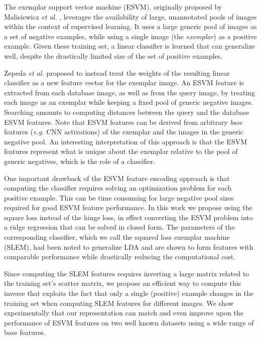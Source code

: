 The exemplar support vector machine (ESVM), originally proposed by Malisiewicz {\it et al.} \cite{Malisiewicza}, leverages the availability of large, unannotated pools of images within the context of supervised learning. It uses a large generic pool of images as a set of negative examples, while using a single image (the \emph{exemplar}) as a positive example. Given these training set, a linear classifier is learned that can  generalize well, despite the drastically limited size of the set of positive examples.

Zepeda \emph{et al.} \cite{ZePe15} proposed to instead treat the weights of the resulting linear classifier as a new feature vector for the exemplar image. %
An ESVM feature is extracted from each database image, as well as from the query image, by treating each image as an exemplar while keeping a fixed pool of generic negative images. Searching amounts to computing distances between the query and the database ESVM features. Note that ESVM features can be derived from arbitrary \emph{base} features ({\it e.g.} CNN activations) of the exemplar and the images in the generic negative pool. An interesting interpretation of this approach is that the ESVM features represent what is unique about the exemplar relative to the pool of generic negatives, which is the role of a classifier.


One important drawback of the ESVM feature encoding approach is that computing the  classifier requires solving an optimization problem for each positive example. This can be time consuming for large negative pool sizes required for good ESVM feature performance. In this work we propose using the square loss instead of the hinge loss, in effect converting the ESVM problem into a ridge regression that can be solved in closed form. The parameters of the corresponding classifier, which we call the squared loss exemplar machine (SLEM), had been noted to generalize LDA \cite{Koba15} and are shown to form features with comparable performance while drastically reducing the computational cost.


Since computing the SLEM features requires inverting a large matrix related to the training set's scatter matrix, we propose an efficient way to compute this inverse that exploits the fact that only a single (positive) example changes in the training set when computing SLEM features for different images. We show experimentally that our representation can match and even improve upon the performance of ESVM features on two well known datasets using a wide range of base features.

